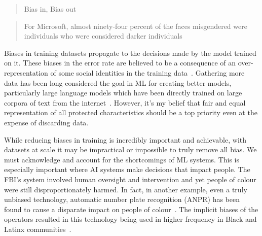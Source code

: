 \documentclass[]{final_report}
\begin{document}
\begin{quote}
  Bias in, Bias out~\cite{facialRecognitionBias}
\end{quote}

\begin{quote}
  For Microsoft, almost ninety-four percent of
  the faces misgendered were individuals who were considered darker individuals~\cite{facialRecognitionBias}
\end{quote}

Biases in training datasets propagate to the decisions made by the model trained on it. These biases in the error rate are believed to be a consequence of an over-representation of some social identities in the training data~\cite{LLMSocialEthicalRisks}. Gathering more data has been long considered the goal in ML for creating better models, particularly large language models which have been directly trained on large corpora of text from the internet~\cite{LLMSocialEthicalRisks}. However, it's my belief that fair and equal representation of all protected characteristics should be a top priority even at the expense of discarding data.

\newpage
While reducing biases in training is incredibly important and achievable, with datasets at scale it may be impractical or impossible to truly remove all bias. We must acknowledge and account for the shortcomings of ML systems. This is especially important where AI systems make decisions that impact people. The FBI's system involved human oversight and intervention and yet people of colour were still disproportionately harmed. In fact, in another example, even a truly unbiased technology, automatic number plate recognition (ANPR) has been found to cause a disparate impact on people of colour~\cite{anprAccountability}. The implicit biases of the operators resulted in this technology being used in higher frequency in Black and Latinx communities~\cite{anprAccountability,facialRecognitionBias}.
\end{document}
